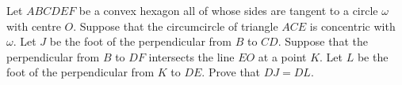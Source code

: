 Let 
$ABCDEF$
 be a convex hexagon all of whose sides are tangent to a circle 
$\omega$
 with centre 
$O$.
 Suppose that the circumcircle of triangle 
$ACE$
 is concentric with 
$\omega$.
 Let 
$J$
 be the foot of the perpendicular from 
$B$
 to 
$CD$.
 Suppose that the perpendicular from 
$B$
 to 
$DF$
 intersects the line 
$EO$
 at a point 
$K$.
 Let 
$L$
 be the foot of the perpendicular from 
$K$
 to 
$DE$.
 Prove that 
$DJ=DL$.
